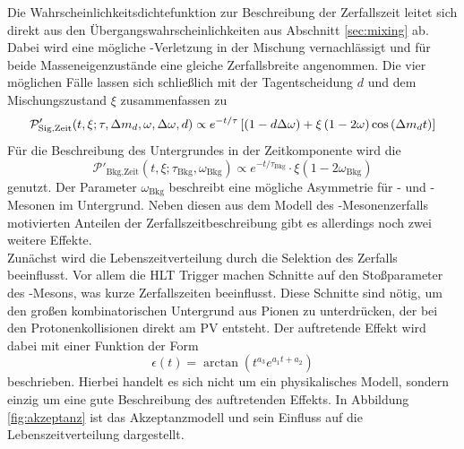Die Wahrscheinlichkeitsdichtefunktion zur Beschreibung der Zerfallszeit leitet sich direkt aus den Übergangswahrscheinlichkeiten aus Abschnitt \ref{sec:mixing} ab. Dabei wird eine mögliche \CP-Verletzung in der Mischung vernachlässigt und für beide Masseneigenzustände eine gleiche Zerfallsbreite angenommen. Die vier möglichen Fälle lassen sich schließlich mit der Tagentscheidung $d$ und dem Mischungszustand $\xi$ zusammenfassen zu
\begin{equation}
\mathcal{P}'_\text{Sig,Zeit}(t,\xi;\tau,{\Delta m_{{d}}},\omega,\Delta\omega,d)\propto e^{-t/\tau}\left[\left(1-d\Delta\omega\right)+\xi\left(1-2\omega\right)\cos\left({\Delta m_{{d}}} t\right)\right]
\end{equation}
Für die Beschreibung des Untergrundes in der Zeitkomponente wird die \PDF 
\begin{equation}
\mathcal{P}'_\text{Bkg,Zeit}(t,\xi;\tau_\text{Bkg},\omega_\text{Bkg})\propto e^{-t/\tau_\text{Bkg}}\cdot\xi\left(1-2\omega_\text{Bkg}\right)
\end{equation}
genutzt. Der Parameter $\omega_\text{Bkg}$ beschreibt eine mögliche Asymmetrie für \Bz- und \Bzb-Mesonen im Untergrund. Neben diesen aus dem Modell des \B-Mesonenzerfalls motivierten Anteilen der Zerfallszeitbeschreibung gibt es allerdings noch zwei weitere  Effekte. \\ 
Zunächst wird die Lebenszeitverteilung durch die Selektion des Zerfalls beeinflusst. Vor allem die HLT Trigger machen Schnitte auf den Stoßparameter des \Bz-Mesons, was kurze Zerfallszeiten beeinflusst. Diese Schnitte sind nötig, um den großen kombinatorischen Untergrund aus Pionen zu unterdrücken, der bei den Protonenkollisionen direkt am PV entsteht. Der auftretende Effekt wird dabei mit einer Funktion der Form
\begin{equation}
\epsilon(t)=\arctan\left(t^{a_3}e^{a_1t+a_2}\right)
\end{equation}
beschrieben. Hierbei handelt es sich nicht um ein physikalisches Modell, sondern einzig um eine gute Beschreibung des auftretenden Effekts. In Abbildung \ref{fig:akzeptanz} ist das Akzeptanzmodell und sein Einfluss auf die Lebenszeitverteilung dargestellt.
